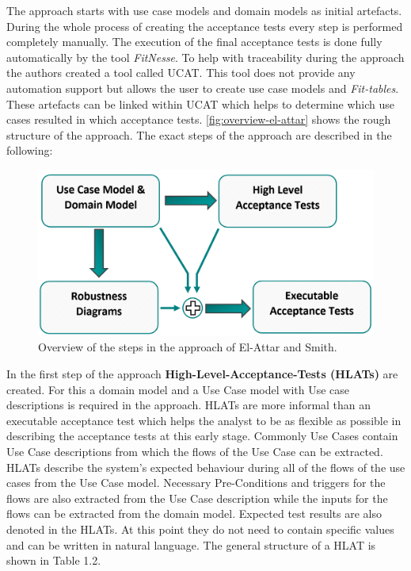 The approach starts with use case models and domain models as initial artefacts.
During the whole process of creating the acceptance tests every step is performed completely manually.
The execution of the final acceptance tests is done fully automatically by the tool \textit{FitNesse}.
To help with traceability during the approach the authors created a tool called UCAT.
This tool does not provide any automation support but allows the user to create use case models and \textit{Fit-tables}.
These artefacts can be linked within UCAT which helps to determine which use cases resulted in which acceptance tests.
 \autoref{fig:overview-el-attar} shows the rough structure of the approach.
The exact steps of the approach are described in the following:

\begin{figure}
	\centering
	\includegraphics[width=.8\textwidth]{../images/ElAttarProcess.png}
	\caption{Overview of the steps in the approach of El-Attar and Smith.}
	\label{fig:overview-el-attar}
\end{figure}

In the first step of the approach \textbf{High-Level-Acceptance-Tests (HLATs)} are created.
For this a domain model and a Use Case model with Use case descriptions is required in the approach.
HLATs are more informal than an executable acceptance test which helps the analyst to be as flexible as possible in describing the acceptance tests at this early stage.
Commonly Use Cases contain Use Case descriptions from which the flows of the Use Case can be extracted.
HLATs describe the system's expected behaviour during all of the flows of the use cases from the Use Case model.
Necessary Pre-Conditions and triggers for the flows are also extracted from the Use Case description while the inputs for the flows can be extracted from the domain model.
Expected test results are also denoted in the HLATs.
At this point they do not need to contain specific values and can be written in natural language.
The general structure of a HLAT is shown in Table 1.2.


